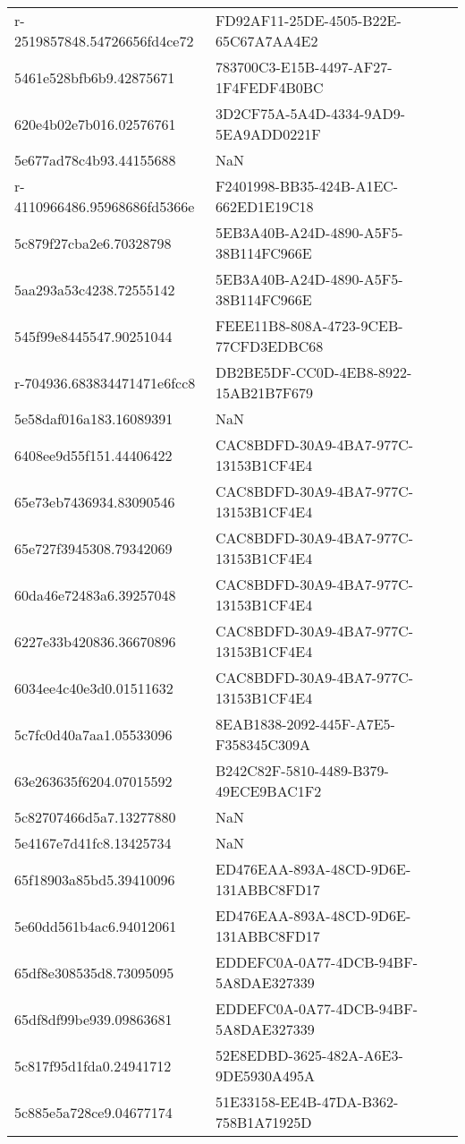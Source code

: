 \begin{tabular}{ll}
r-2519857848.54726656fd4ce72 & FD92AF11-25DE-4505-B22E-65C67A7AA4E2 \\
5461e528bfb6b9.42875671 & 783700C3-E15B-4497-AF27-1F4FEDF4B0BC \\
620e4b02e7b016.02576761 & 3D2CF75A-5A4D-4334-9AD9-5EA9ADD0221F \\
5e677ad78c4b93.44155688 & NaN \\
r-4110966486.95968686fd5366e & F2401998-BB35-424B-A1EC-662ED1E19C18 \\
5c879f27cba2e6.70328798 & 5EB3A40B-A24D-4890-A5F5-38B114FC966E \\
5aa293a53c4238.72555142 & 5EB3A40B-A24D-4890-A5F5-38B114FC966E \\
545f99e8445547.90251044 & FEEE11B8-808A-4723-9CEB-77CFD3EDBC68 \\
r-704936.683834471471e6fcc8 & DB2BE5DF-CC0D-4EB8-8922-15AB21B7F679 \\
5e58daf016a183.16089391 & NaN \\
6408ee9d55f151.44406422 & CAC8BDFD-30A9-4BA7-977C-13153B1CF4E4 \\
65e73eb7436934.83090546 & CAC8BDFD-30A9-4BA7-977C-13153B1CF4E4 \\
65e727f3945308.79342069 & CAC8BDFD-30A9-4BA7-977C-13153B1CF4E4 \\
60da46e72483a6.39257048 & CAC8BDFD-30A9-4BA7-977C-13153B1CF4E4 \\
6227e33b420836.36670896 & CAC8BDFD-30A9-4BA7-977C-13153B1CF4E4 \\
6034ee4c40e3d0.01511632 & CAC8BDFD-30A9-4BA7-977C-13153B1CF4E4 \\
5c7fc0d40a7aa1.05533096 & 8EAB1838-2092-445F-A7E5-F358345C309A \\
63e263635f6204.07015592 & B242C82F-5810-4489-B379-49ECE9BAC1F2 \\
5c82707466d5a7.13277880 & NaN \\
5e4167e7d41fc8.13425734 & NaN \\
65f18903a85bd5.39410096 & ED476EAA-893A-48CD-9D6E-131ABBC8FD17 \\
5e60dd561b4ac6.94012061 & ED476EAA-893A-48CD-9D6E-131ABBC8FD17 \\
65df8e308535d8.73095095 & EDDEFC0A-0A77-4DCB-94BF-5A8DAE327339 \\
65df8df99be939.09863681 & EDDEFC0A-0A77-4DCB-94BF-5A8DAE327339 \\
5c817f95d1fda0.24941712 & 52E8EDBD-3625-482A-A6E3-9DE5930A495A \\
5c885e5a728ce9.04677174 & 51E33158-EE4B-47DA-B362-758B1A71925D \\

\end{tabular}
